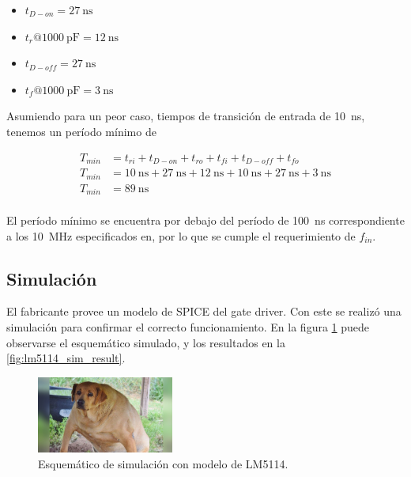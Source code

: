 \begin{itemize}
    \item $t_{D-on} = \qty{27}{\nano\second}$
    \item $t_{r} @ \qty{1000}{\pico\farad} = \qty{12}{\nano\second}$
    \item $t_{D-off} = \qty{27}{\nano\second}$
    \item $t_{f} @ \qty{1000}{\pico\farad} = \qty{3}{\nano\second}$
\end{itemize}

Asumiendo para un peor caso, tiempos de transición de entrada de
\qty{10}{\nano\second},  tenemos un período mínimo de

\begin{equation}
    \begin{aligned}
        T_{min} &= t_{ri} + t_{D-on} + t_{ro} + t_{fi} + t_{D-off} + t_{fo} \\
        T_{min} &= \qty{10}{\nano\second} + \qty{27}{\nano\second} +
        \qty{12}{\nano\second} + \qty{10}{\nano\second} + \qty{27}{\nano\second}
        + \qty{3}{\nano\second} \\
        T_{min} &= \qty{89}{\nano\second} \\
    \end{aligned}
\end{equation}

El período mínimo se encuentra por debajo del período de \qty{100}{\nano\second}
correspondiente a los \qty{10}{\mega\hertz} especificados en, por lo que se
cumple el requerimiento de $f_{in}$.

\subsection{Simulación}

El fabricante provee un modelo de SPICE del gate driver. Con este se realizó una
simulación para confirmar el correcto funcionamiento. En la figura
\ref{fig:lm5114_sim_sch} puede observarse el esquemático simulado, y los
resultados en la \ref{fig:lm5114_sim_result}.

\begin{figure}[tbp]
    \centering
    \includegraphics[width=0.4\textwidth]{images/placeholder.jpg}
    \caption{Esquemático de simulación con modelo de LM5114.}
    \label{fig:lm5114_sim_sch}
\end{figure}


